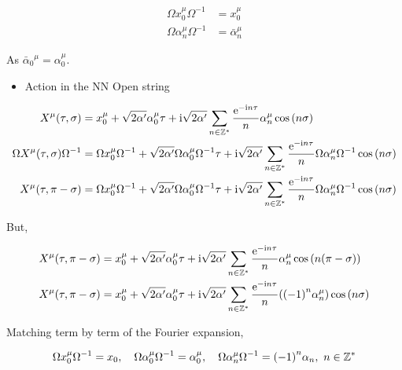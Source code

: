 \begin{align*}
    \Omega x_0^\mu \Omega^{-1}&=x_0^\mu\\
    \Omega \alpha_n^\mu \Omega^{-1}&={\bar\alpha}_n^\mu
\end{align*}

As ${\bar \alpha_0}^\mu=\alpha_0^\mu$.

\begin{itemize}
    \item Action in the NN Open string
\end{itemize}
\begin{align*}
    X^{\mu}\qty(\tau,\sigma)&=x^\mu_0+\sqrt{2\alpha'}\alpha^\mu_0\tau+\textnormal{i} \sqrt{2\alpha'}\sum\limits_{n\in\mathbb Z^\ast}\frac{\textnormal{e}^{-\textnormal{i} n\tau}}{n}{\alpha}^\mu_n\cos\qty( n\sigma)\\
    \Omega X ^{\mu}\qty(\tau,\sigma)\Omega^{-1}&=\Omega x^\mu_0\Omega^{-1}+\sqrt{2\alpha'}\Omega\alpha^\mu_0\Omega^{-1}\tau+\textnormal{i} \sqrt{2\alpha'}\sum\limits_{n\in\mathbb Z^\ast}\frac{\textnormal{e}^{-\textnormal{i} n\tau}}{n}\Omega{\alpha}^\mu_n\Omega^{-1}\cos\qty( n\sigma)\\
    X^{\mu}\qty(\tau,\pi-\sigma)&=\Omega x^\mu_0\Omega^{-1}+\sqrt{2\alpha'}\Omega\alpha^\mu_0\Omega^{-1}\tau+\textnormal{i} \sqrt{2\alpha'}\sum\limits_{n\in\mathbb Z^\ast}\frac{\textnormal{e}^{-\textnormal{i} n\tau}}{n}\Omega{\alpha}^\mu_n\Omega^{-1}\cos\qty( n\sigma)
\end{align*}

But,

\begin{align*}
    X^{\mu}\qty(\tau,\pi-\sigma)&=x^\mu_0+\sqrt{2\alpha'}\alpha^\mu_0\tau+\textnormal{i} \sqrt{2\alpha'}\sum\limits_{n\in\mathbb Z^\ast}\frac{\textnormal{e}^{-\textnormal{i} n\tau}}{n}{\alpha}^\mu_n\cos\qty( n\qty(\pi-\sigma))\\
    X^{\mu}\qty(\tau,\pi-\sigma)&=x^\mu_0+\sqrt{2\alpha'}\alpha^\mu_0\tau+\textnormal{i} \sqrt{2\alpha'}\sum\limits_{n\in\mathbb Z^\ast}\frac{\textnormal{e}^{-\textnormal{i} n\tau}}{n}\qty(\qty(-1)^{n}{\alpha}^\mu_n)\cos\qty( n\sigma)
\end{align*}

Matching term by term of the Fourier expansion,

\begin{align*}
    \Omega x_0^\mu\Omega^{-1}=x_0,\ \ \ \Omega\alpha_0^\mu\Omega^{-1}=\alpha_0^\mu,\ \ \ \Omega \alpha_n^\mu\Omega^{-1}=\qty(-1)^{n}\alpha_n,\ n\in\mathbb Z^\ast
\end{align*}

